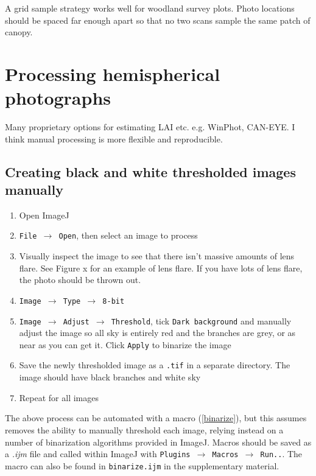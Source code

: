 \documentclass{article}
\begin{document}

A grid sample strategy works well for woodland survey plots. Photo locations should be spaced far enough apart so that no two scans sample the same patch of canopy. 

\section{Processing hemispherical photographs}

Many proprietary options for estimating LAI etc. e.g. WinPhot, CAN-EYE. I think manual processing is more flexible and reproducible.

\subsection{Creating black and white thresholded images manually}

\begin{enumerate}
	\item{Open ImageJ}
	\item{\texttt{File $\rightarrow$ Open}, then select an image to process}
	\item{Visually inspect the image to see that there isn't massive amounts of lens flare. See Figure x for an example of lens flare. If you have lots of lens flare, the photo should be thrown out.}
	\item{\texttt{Image $\rightarrow$ Type $\rightarrow$ 8-bit}}
	\item{\texttt{Image $\rightarrow$ Adjust $\rightarrow$ Threshold}, tick \texttt{Dark background} and manually adjust the image so all sky is entirely red and the branches are grey, or as near as you can get it. Click \texttt{Apply} to binarize the image}
	\item{Save the newly thresholded image as a \texttt{.tif} in a separate directory. The image should have black branches and white sky}
	\item{Repeat for all images}
\end{enumerate}

The above process can be automated with a macro (\autoref{binarize}), but this assumes removes the ability to manually threshold each image, relying instead on a number of binarization algorithms provided in ImageJ. Macros should be saved as a \textit{.ijm} file and called within ImageJ with \texttt{Plugins $\rightarrow$ Macros $\rightarrow$ Run..}. The macro can also be found in \texttt{binarize.ijm} in the supplementary material.
\end{document}
